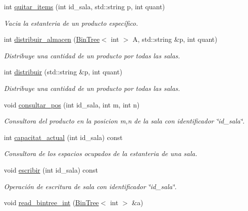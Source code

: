 \begin{DoxyCompactItemize}
int \mbox{\hyperlink{class_almacen_a9352bd3ee6b624a02283c627d27aec3e}{quitar\+\_\+items}} (int id\+\_\+sala, std\+::string p, int quant)
\begin{DoxyCompactList}\small\item\em Vacia la estanteria de un producto específico. \end{DoxyCompactList}\item 
int \mbox{\hyperlink{class_almacen_a2535172748b53c612e9347da5fd3bec6}{distribuir\+\_\+almacen}} (\mbox{\hyperlink{class_bin_tree}{Bin\+Tree}}$<$ int $>$ A, std\+::string \&p, int quant)
\begin{DoxyCompactList}\small\item\em Distribuye una cantidad de un producto por todas las salas. \end{DoxyCompactList}\item 
int \mbox{\hyperlink{class_almacen_af43c26eb16a3438cae08a14a86bc53cd}{distribuir}} (std\+::string \&p, int quant)
\begin{DoxyCompactList}\small\item\em Distribuye una cantidad de un producto por todas las salas. \end{DoxyCompactList}\item 
void \mbox{\hyperlink{class_almacen_a18a63aaa7ce218993dcb4619e17b7633}{consultar\+\_\+pos}} (int id\+\_\+sala, int m, int n)
\begin{DoxyCompactList}\small\item\em Consultora del producto en la posicion m,n de la sala con identificador \char`\"{}id\+\_\+sala\char`\"{}. \end{DoxyCompactList}\item 
int \mbox{\hyperlink{class_almacen_ab340c6592772278729f802dbb13a52d2}{capacitat\+\_\+actual}} (int id\+\_\+sala) const
\begin{DoxyCompactList}\small\item\em Consultora de los espacios ocupados de la estanteria de una sala. \end{DoxyCompactList}\item 
void \mbox{\hyperlink{class_almacen_ad43c08da5df70f57bc9fe4da44a5d83c}{escribir}} (int id\+\_\+sala) const
\begin{DoxyCompactList}\small\item\em Operación de escritura de sala con identificador \char`\"{}id\+\_\+sala\char`\"{}. \end{DoxyCompactList}\item 
void \mbox{\hyperlink{class_almacen_afd1437f2b2157c3eb63321c467d4a8f2}{read\+\_\+bintree\+\_\+int}} (\mbox{\hyperlink{class_bin_tree}{Bin\+Tree}}$<$ int $>$ \&a)

\end{DoxyCompactItemize}

